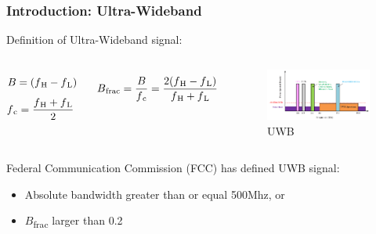 \documentclass[10pt]{beamer}
\begin{document}
\begin{frame}
    \frametitle{Introduction: Ultra-Wideband}
    Definition of Ultra-Wideband signal:
\begin{columns}
    \begin{equation}
        B=(f\textsubscript{H} - f\textsubscript{L})
    \end{equation}
    \begin{equation}
        f\textsubscript{c} = \frac{f\textsubscript{H} + f\textsubscript{L}}{2}\
    \end{equation} 

    \begin{equation}
        B\textsubscript{frac} =\frac{B}{f\textsubscript{c}} = \frac{2(f\textsubscript{H} - f\textsubscript{L})}{f\textsubscript{H} + f\textsubscript{L}}
    \end{equation}

    \begin{figure}[H]
    \centering
    \includegraphics[width=1\textwidth]{uwb_versus_other_radio_communication_systems.png}
    \caption{UWB}
    \label{fig:uwb_versus_other_radio_communication_systems}
    \end{figure}
\end{columns}
Federal Communication Commission (FCC) has defined UWB signal:
\begin{itemize} 
    \item Absolute bandwidth greater than or equal 500Mhz, or
    \item $B$\textsubscript{frac} larger than 0.2
\end{itemize}
\end{frame}
\end{document}

